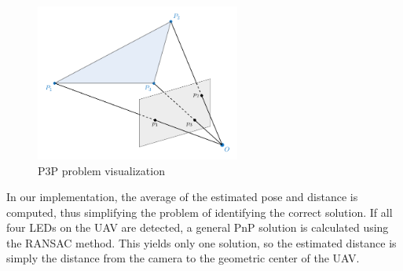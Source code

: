 \begin{figure}[H]
	\centering
	\includegraphics[width=0.60\textwidth]{./fig/tikz/p3p.pdf}
	\caption{P3P problem visualization}
	\label{fig:p3p}
\end{figure}
In our implementation, the average of the estimated pose and distance is computed, thus simplifying the problem of identifying the correct solution. If all four \ac{LED}s on the \ac{UAV} are detected, a general \ac{PnP} solution is calculated using the \ac{RANSAC} method. This yields only one solution, so the
estimated distance is simply the distance from the camera to the geometric center of the \ac{UAV}.